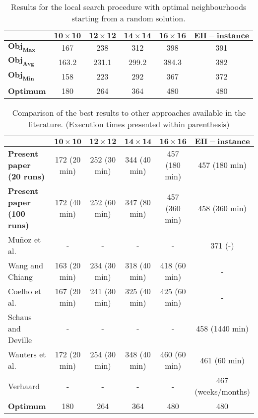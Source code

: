 \documentclass[preprint,12pt]{elsarticle}
\begin{document}
\begin{table}[h]
	
			\begin{tabular}{l c c c c c}
		\hline
		&	$\mathbf{10 \times 10}$ & $\mathbf{12 \times 12}$ & $\mathbf{14 \times 14}$ & $\mathbf{16 \times 16}$ & $\mathbf{EII-instance}$\\
		\hline
		$\mathbf{Obj_{Max}}$ & 167 & 238 & 312 & 398 & 391 \\
$\mathbf{Obj_{Avg}}$ & 163.2 & 231.1 & 299.2 & 384.3 & 382 \\
$\mathbf{Obj_{Min}}$ & 158 & 223 & 292 & 367 & 372 \\
	\hline
		\textbf{Optimum} & 180 & 264 & 364 & 480 & 480\\
	\hline
		\end{tabular}
	\caption{Results for the local search procedure with optimal neighbourhoods starting from a random solution.}
	\label{tab:localsearchonly}
	\end{table}
	
	
	\begin{table}
	\scriptsize
		\centering
		\begin{tabular}{l c c c c c}
		\hline
		&	$\mathbf{10 \times 10}$ & $\mathbf{12 \times 12}$ & $\mathbf{14 \times 14}$ & $\mathbf{16 \times 16}$ & $\mathbf{EII-instance}$\\
		\hline
	\textbf{Present paper (20 runs)}	 & 172 (20 min)  & 252 (30 min) & 344 (40 min) & 457 (180 min) & 457 (180 min)\\
	\textbf{Present paper (100 runs)}	 & 172 (40 min)  & 252 (60 min)& 347 (80 min) & 457 (360 min)  & 458 (360 min) \\\hline
	Mu\~noz et al.\ \cite{MGS09} 							 & - & - & - & - & 371 (-) \\
	Wang and Chiang \cite{WC10} & 163 (20 min)  & 234 (30 min) & 318 (40 min) & 418 (60 min) & -\\
	Coelho et al.\ \cite{CCCHSO10} & 167 (20 min)  & 241 (30 min) & 325 (40 min) & 425 (60 min) & -\\
	Schaus and Deville \cite{SD08} &  - &  - & - & - & 458 (1440 min)\\
	Wauters et al.\ \cite{WVV12} & 172 (20 min)  & 254 (30 min) & 348 (40 min) & 460 (60 min) & 461 (60 min)\\
	Verhaard \cite{VE08} & - & - & - & - & 467 (weeks/months)\\
	\hline
	\textbf{Optimum} & 180 & 264 & 364 & 480 & 480\\
	\hline
		\end{tabular}
	\caption{Comparison of the best results to other approaches available in the literature. (Execution times presented within parenthesis)}
	\label{tab:comparison}
	\end{table}
	
\end{document}
